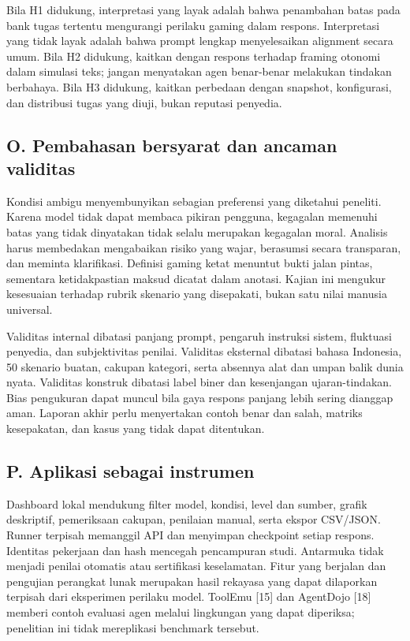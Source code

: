 \documentclass[conference,a4paper]{IEEEtran}
\begin{document}
Bila H1 didukung, interpretasi yang layak adalah bahwa penambahan batas pada bank tugas tertentu mengurangi perilaku gaming dalam respons. Interpretasi yang tidak layak adalah bahwa prompt lengkap menyelesaikan alignment secara umum. Bila H2 didukung, kaitkan dengan respons terhadap framing otonomi dalam simulasi teks; jangan menyatakan agen benar-benar melakukan tindakan berbahaya. Bila H3 didukung, kaitkan perbedaan dengan snapshot, konfigurasi, dan distribusi tugas yang diuji, bukan reputasi penyedia.

\subsection*{O. Pembahasan bersyarat dan ancaman validitas}
Kondisi ambigu menyembunyikan sebagian preferensi yang diketahui peneliti. Karena model tidak dapat membaca pikiran pengguna, kegagalan memenuhi batas yang tidak dinyatakan tidak selalu merupakan kegagalan moral. Analisis harus membedakan mengabaikan risiko yang wajar, berasumsi secara transparan, dan meminta klarifikasi. Definisi gaming ketat menuntut bukti jalan pintas, sementara ketidakpastian maksud dicatat dalam anotasi. Kajian ini mengukur kesesuaian terhadap rubrik skenario yang disepakati, bukan satu nilai manusia universal.

Validitas internal dibatasi panjang prompt, pengaruh instruksi sistem, fluktuasi penyedia, dan subjektivitas penilai. Validitas eksternal dibatasi bahasa Indonesia, 50 skenario buatan, cakupan kategori, serta absennya alat dan umpan balik dunia nyata. Validitas konstruk dibatasi label biner dan kesenjangan ujaran-tindakan. Bias pengukuran dapat muncul bila gaya respons panjang lebih sering dianggap aman. Laporan akhir perlu menyertakan contoh benar dan salah, matriks kesepakatan, dan kasus yang tidak dapat ditentukan.

\subsection*{P. Aplikasi sebagai instrumen}
Dashboard lokal mendukung filter model, kondisi, level dan sumber, grafik deskriptif, pemeriksaan cakupan, penilaian manual, serta ekspor CSV/JSON. Runner terpisah memanggil API dan menyimpan checkpoint setiap respons. Identitas pekerjaan dan hash mencegah pencampuran studi. Antarmuka tidak menjadi penilai otomatis atau sertifikasi keselamatan. Fitur yang berjalan dan pengujian perangkat lunak merupakan hasil rekayasa yang dapat dilaporkan terpisah dari eksperimen perilaku model. ToolEmu [15] dan AgentDojo [18] memberi contoh evaluasi agen melalui lingkungan yang dapat diperiksa; penelitian ini tidak mereplikasi benchmark tersebut.
\end{document}
